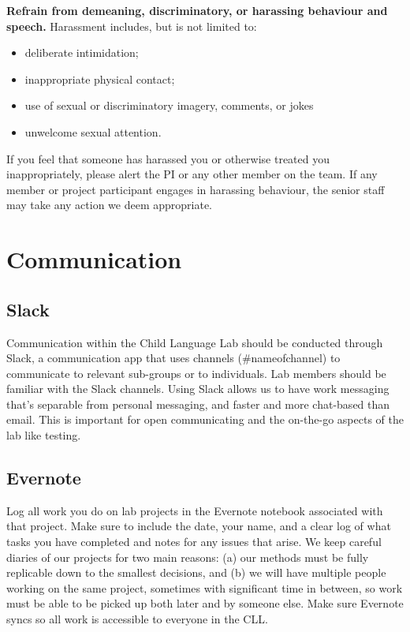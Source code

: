 \documentclass[
]{book}
\providecommand{\tightlist}{%
  \setlength{\itemsep}{0pt}\setlength{\parskip}{0pt}}
\begin{document}
\textbf{Refrain from demeaning, discriminatory, or harassing behaviour and speech.} Harassment includes, but is not limited to:

\begin{itemize}
\tightlist
\item
  deliberate intimidation;
\item
  inappropriate physical contact;
\item
  use of sexual or discriminatory imagery, comments, or jokes
\item
  unwelcome sexual attention.
\end{itemize}

If you feel that someone has harassed you or otherwise treated you inappropriately, please alert the PI or any other member on the team. If any member or project participant engages in harassing behaviour, the senior staff may take any action we deem appropriate.

\hypertarget{communication}{%
\chapter{Communication}\label{communication}}

\hypertarget{slack}{%
\section{Slack}\label{slack}}

Communication within the Child Language Lab should be conducted through Slack, a communication app that uses channels (\#nameofchannel) to communicate to relevant sub-groups or to individuals. Lab members should be familiar with the Slack channels. Using Slack allows us to have work messaging that's separable from personal messaging, and faster and more chat-based than email. This is important for open communicating and the on-the-go aspects of the lab like testing.

\hypertarget{evernote}{%
\section{Evernote}\label{evernote}}

Log all work you do on lab projects in the Evernote notebook associated with that project. Make sure to include the date, your name, and a clear log of what tasks you have completed and notes for any issues that arise. We keep careful diaries of our projects for two main reasons: (a) our methods must be fully replicable down to the smallest decisions, and (b) we will have multiple people working on the same project, sometimes with significant time in between, so work must be able to be picked up both later and by someone else. Make sure Evernote syncs so all work is accessible to everyone in the CLL.
\end{document}
